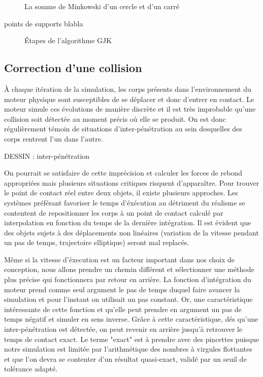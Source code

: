 \begin{figure}
  \caption{La somme de Minkowski d'un cercle et d'un carré}
\end{figure}

points de supports blabla

\begin{figure}
  
  \caption{{\'E}tapes de l'algorithme GJK}
\end{figure}

\subsection{Correction d'une collision}

\`A chaque itération de la simulation, les corps présents dans l'environnement du moteur physique sont susceptibles de se déplacer et donc d'entrer en contact. Le moteur simule ces évolutions de manière discrète et il est très improbable qu'une collision soit détectée au moment précis o\`u elle se produit. On est donc régulièrement témoin de situations d'inter-pénétration au sein desquelles des corps rentrent l'un dans l'autre.

DESSIN : inter-pénétration

On pourrait se satisfaire de cette imprécision et calculer les forces de rebond appropriées mais plusieurs situations critiques risquent d'apparaître. Pour trouver le point de contact réel entre deux objets, il existe plusieurs approches. Les systèmes préférant favoriser le temps d'éxécution au détriment du réalisme se contentent de repositionner les corps à un point de contact calculé par interpolation en fonction du temps de la dernière intégration. Il est évident que des objets sujets à des déplacements non linéaires (variation de la vitesse pendant un pas de temps, trajectoire elliptique) seront mal replacés.

Même si la vitesse d'éxecution est un facteur important dans nos choix de conception, nous allons prendre un chemin différent et sélectionner une méthode plus précise qui fonctionnera par retour en arrière. La fonction d'intégration du moteur prend comme seul argument le pas de temps duquel faire avancer la simulation et pour l'instant on utilisait un pas constant. Or, une caractéristique intéressante de cette fonction et qu'elle peut prendre en argument un pas de temps négatif et simuler en sens inverse. Grâce à cette caractéristique, dés qu'une inter-pénétration est détectée, on peut revenir en arrière jusqu'à retrouver le temps de contact exact. Le terme "exact" est à prendre avec des pincettes puisque notre simulation est limitée par l'arithmétique des nombres à virgules flottantes et que l'on devra se contenter d'un résultat quasi-exact, validé par un seuil de tolérance adapté.


